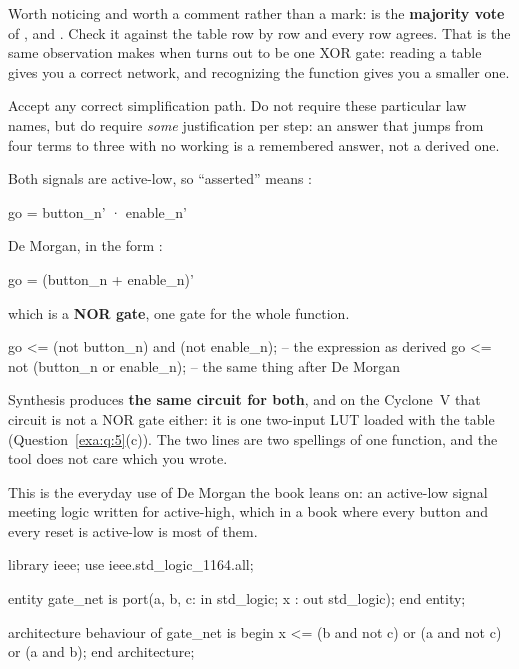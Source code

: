 Worth noticing and worth a comment rather than a mark:  is the
\textbf{majority vote} of ,  and . Check it against the table row by row
and every row agrees. That is the same observation  makes when  turns
out to be one XOR gate: reading a table gives you a correct network, and recognizing the function
gives you a smaller one.

Accept any correct simplification path. Do not require these particular law names, but do require
\emph{some} justification per step: an answer that jumps from four terms to three with no working
is a remembered answer, not a derived one.

Both signals are active-low, so ``asserted'' means :

\begin{textdrawing}
go = button_n' · enable_n'
\end{textdrawing}

De Morgan, in the form :

\begin{console}
go = (button_n + enable_n)'
\end{console}

\noindent which is a \textbf{NOR gate}, one gate for the whole function. 

\begin{vhdlcode}
go <= (not button_n) and (not enable_n);   -- the expression as derived
go <= not (button_n or enable_n);          -- the same thing after De Morgan
\end{vhdlcode}

\noindent Synthesis produces \textbf{the same circuit for both}, and on the Cyclone~V that circuit
is not a NOR gate either: it is one two-input LUT loaded with the table
(Question~\ref{exa:q:5}(c)). The two lines are two spellings of one function, and the tool does not
care which you wrote. 

This is the everyday use of De Morgan the book leans on: an active-low signal meeting logic written
for active-high, which in a book where every button and every reset is active-low is most of them.

\begin{vhdlcode}
library ieee;
use ieee.std_logic_1164.all;

entity gate_net is
    port(a, b, c: in  std_logic;
         x      : out std_logic);
end entity;

architecture behaviour of gate_net is
begin
    x <= (b and not c) or (a and not c) or (a and b);
end architecture;
\end{vhdlcode}

